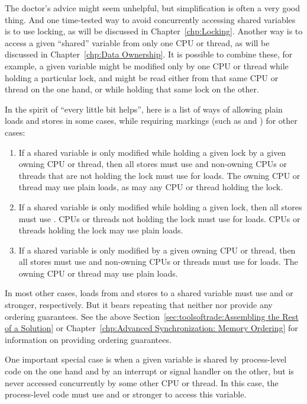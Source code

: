 The doctor's advice might seem unhelpful, but simplification is often
a very good thing.
And one time-tested way to avoid concurrently accessing shared variables
is to use locking, as will be discussed in
Chapter~\ref{chp:Locking}.
Another way is to access a given ``shared'' variable from only one
CPU or thread, as will be discussed in
Chapter~\ref{chp:Data Ownership}.
It is possible to combine these, for example, a given variable might
be modified only by one CPU or thread while holding a particular lock,
and might be read either from that same CPU or thread on the one hand,
or while holding that same lock on the other.

In the spirit of ``every little bit helps'', here is a list of
ways of allowing plain loads and stores in some cases, while requiring
markings (such as  and ) for other
cases:

\begin{enumerate}
\item	If a shared variable is only modified while holding a given
	lock by a given owning CPU or thread, then all stores must use
	 and non-owning CPUs or threads that
	are not holding the lock must use  for loads.
	The owning CPU or thread may use plain loads, as may any
	CPU or thread holding the lock.
\item	If a shared variable is only modified while holding a given
	lock, then all stores must use .
	CPUs or threads not holding the lock must use 
	for loads.
	CPUs or threads holding the lock may use plain loads.
\item	If a shared variable is only modified by a given owning CPU or
	thread, then all stores must use  and non-owning
	CPUs or threads must use  for loads.
	The owning CPU or thread may use plain loads.
\end{enumerate}

In most other cases, loads from and stores to a shared variable must
use  and  or stronger, respectively.
But it bears repeating that neither  nor 
provide any ordering guarantees.
See the above
Section~\ref{sec:toolsoftrade:Assembling the Rest of a Solution} or
Chapter~\ref{chp:Advanced Synchronization: Memory Ordering}
for information on providing ordering guarantees.

One important special case is when a given variable is shared by
process-level code on the one hand and by an interrupt or signal handler
on the other, but is never accessed concurrently by some other CPU or
thread.
In this case, the process-level code must use  and
 or stronger to access this variable.

